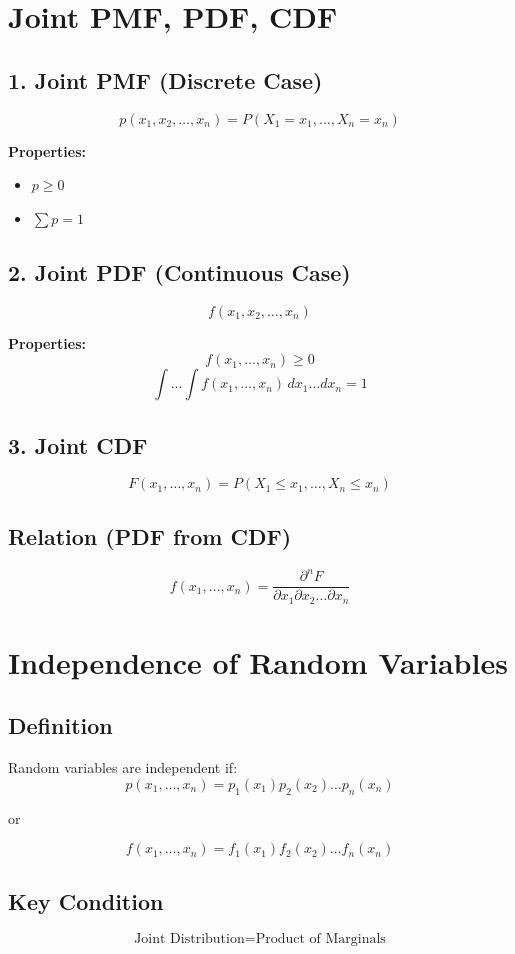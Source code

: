 \documentclass[12pt]{article}
\begin{document}
\section*{Joint PMF, PDF, CDF}

\subsection*{1. Joint PMF (Discrete Case)}
\[
p(x_1, x_2, \dots, x_n) = P(X_1=x_1, \dots, X_n=x_n)
\]

\textbf{Properties:}
\begin{itemize}
    \item $p \ge 0$
    \item $\sum p = 1$
\end{itemize}

\subsection*{2. Joint PDF (Continuous Case)}
\[
f(x_1, x_2, \dots, x_n)
\]

\textbf{Properties:}
\[
f(x_1, \dots, x_n) \ge 0
\]
\[
\int \dots \int f(x_1, \dots, x_n)\, dx_1 \dots dx_n = 1
\]

\subsection*{3. Joint CDF}
\[
F(x_1, \dots, x_n) = P(X_1 \le x_1, \dots, X_n \le x_n)
\]

\subsection*{Relation (PDF from CDF)}
\[
f(x_1, \dots, x_n) = \frac{\partial^n F}{\partial x_1 \partial x_2 \dots \partial x_n}
\]

\section*{Independence of Random Variables}

\subsection*{Definition}
Random variables are independent if:
\[
p(x_1, \dots, x_n) = p_1(x_1)p_2(x_2)\dots p_n(x_n)
\]

or

\[
f(x_1, \dots, x_n) = f_1(x_1)f_2(x_2)\dots f_n(x_n)
\]

\subsection*{Key Condition}
\[
\text{Joint Distribution} = \text{Product of Marginals}
\]
\end{document}
